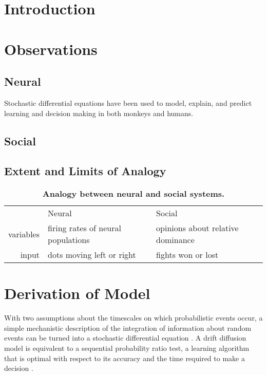 \documentclass{article}
\newcommand{\ra}[1]{\renewcommand{\arraystretch}{#1}}
\begin{document}
\section{Introduction}

\section{Observations }

\subsection{Neural }
Stochastic differential equations have been used to model, explain, and predict learning and decision making in both monkeys and humans. \citep{Eckhoff:2008uq, Brown:2005fk,Feng:2009kl,Bogacz:2006uq}


\subsection{Social }

\subsection{Extent and Limits of Analogy }


\begin{table}\centering
\caption{\label{analogy}{\bf  Analogy between neural and social systems.} }
\ra{1.3}
\begin{tabular}{@{}rllll@{}}
&Neural &  \phantom{abc}& Social \\
\cmidrule{2-2} \cmidrule{4-4} 
variables &  firing rates of neural populations && opinions about relative dominance
\\ input & dots moving left or right && fights won or lost
\\ 
\end{tabular}
\end{table}

\section{Derivation of Model}
With two assumptions about the timescales on which probabilistic events occur, a simple mechanistic description of the integration of information about random events can be turned into a stochastic differential equation \cite{Gillespie:2000fk}.  A drift diffusion model is equivalent to a sequential probability ratio test, a learning algorithm that is optimal with respect to its accuracy and the time required to make a decision \cite{Moehlis:2004fk,Bogacz:2006uq}.  
\end{document}
